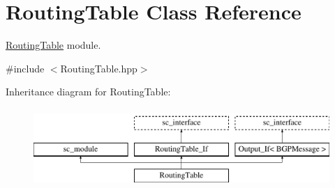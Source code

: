 \hypertarget{classRoutingTable}{\section{Routing\-Table Class Reference}
\label{classRoutingTable}
}


\hyperlink{classRoutingTable}{Routing\-Table} module.  




{\ttfamily \#include $<$Routing\-Table.\-hpp$>$}

Inheritance diagram for Routing\-Table\-:\begin{figure}[H]
\begin{center}
\leavevmode
\includegraphics[height=3.000000cm]{classRoutingTable}
\end{center}
\end{figure}
